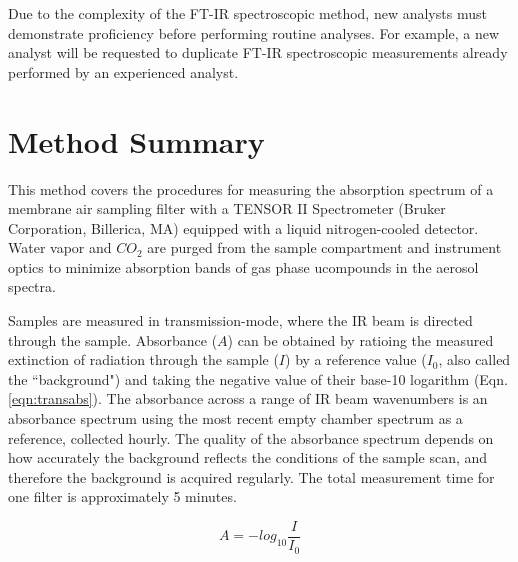 \documentclass[12pt]{article}
\begin{document}
Due to the complexity of the FT-IR spectroscopic method, new analysts must demonstrate proficiency before performing routine analyses.  For example, a new analyst will be requested to duplicate FT-IR spectroscopic measurements already performed by an experienced analyst.

\section{Method Summary}
This method covers the procedures for measuring the absorption spectrum of a membrane air sampling filter with a TENSOR II Spectrometer (Bruker Corporation, Billerica, MA) equipped with a liquid nitrogen-cooled detector. Water vapor and $CO_2$ are purged from the sample compartment and instrument optics to minimize absorption bands of gas phase ucompounds in the aerosol spectra. 

Samples are measured in transmission-mode, where the IR beam is directed through the sample. Absorbance ($A$) can be obtained by ratioing the measured extinction of radiation through the sample ($I$) by a reference value ($I_0$, also called the ``background") and taking the negative value of their base-10 logarithm (Eqn. \ref{eqn:transabs}). The absorbance across a range of IR beam wavenumbers is an absorbance spectrum using the most recent empty chamber spectrum as a reference, collected hourly. The quality of the absorbance spectrum depends on how accurately the background reflects the conditions of the sample scan, and therefore the background is acquired regularly. The total measurement time for one filter is approximately 5 minutes.

\begin{equation}
    A = -log_{10}\frac{I}{I_0}
\label{eqn:transabs}
\end{equation}
\end{document}
